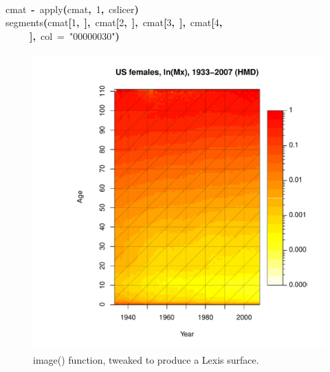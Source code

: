 \documentclass[a4paper]{article}
\newcommand{\hlnumber}[1]{\textcolor[rgb]{0.0823529411764706,0.0784313725490196,0.709803921568627}{#1}}%
\newcommand{\hlfunctioncall}[1]{\textcolor[rgb]{1,0,0}{#1}}%
\newcommand{\hlstring}[1]{\textcolor[rgb]{0.6,0.6,1}{#1}}%
\newcommand{\hlkeyword}[1]{\textcolor[rgb]{0,0,0}{\textbf{#1}}}%
\newcommand{\hlargument}[1]{\textcolor[rgb]{0.694117647058824,0.247058823529412,0.0196078431372549}{#1}}%
\newcommand{\hlassignement}[1]{\textcolor[rgb]{0.215686274509804,0.215686274509804,0.384313725490196}{\textbf{#1}}}%
\newcommand{\hlsymbol}[1]{\textcolor[rgb]{0,0,0}{#1}}%
\newcommand{\hlprompt}[1]{\textcolor[rgb]{0,0,0}{#1}}%
\newcommand{\hlstd}[1]{\textcolor[rgb]{0,0,0}{#1}}%
\newenvironment{Houtput}{\raggedright}{%
%
}
\begin{document}
\begin{Houtput}
\hlstd{}\hlprompt{{\ }}\hlkeyword{\usebox{\hlnormalsizeboxclosebrace}}\mbox{}
\normalfont
\hspace*{\fill}\\
\hlstd{}\ttfamily\noindent
\hlprompt{\usebox{\hlnormalsizeboxgreaterthan}{\ }}\hlsymbol{cmat}{\ }\hlassignement{\usebox{\hlnormalsizeboxlessthan}-}{\ }\hlfunctioncall{apply}\hlkeyword{(}\hlsymbol{cmat}\hlkeyword{,}{\ }\hlnumber{1}\hlkeyword{,}{\ }\hlsymbol{cslicer}\hlkeyword{)}\mbox{}
\normalfont
\hspace*{\fill}\\
\hlstd{}\ttfamily\noindent
\hlprompt{\usebox{\hlnormalsizeboxgreaterthan}{\ }}\hlfunctioncall{segments}\hlkeyword{(}\hlsymbol{cmat}\hlkeyword{[}\hlnumber{1}\hlkeyword{,}{\ }\hlkeyword{]}\hlkeyword{,}{\ }\hlsymbol{cmat}\hlkeyword{[}\hlnumber{2}\hlkeyword{,}{\ }\hlkeyword{]}\hlkeyword{,}{\ }\hlsymbol{cmat}\hlkeyword{[}\hlnumber{3}\hlkeyword{,}{\ }\hlkeyword{]}\hlkeyword{,}{\ }\hlsymbol{cmat}\hlkeyword{[}\hlnumber{4}\hlkeyword{,}\hspace*{\fill}\\
\hlstd{}\hlprompt{{\ }}{\ }{\ }{\ }{\ }\hlkeyword{]}\hlkeyword{,}{\ }\hlargument{col}{\ }\hlargument{=}{\ }\hlstring{"\usebox{\hlnormalsizeboxhash}00000030"}\hlkeyword{)}\mbox{}
\normalfont
\hspace*{\fill}\\
\hlstd{}
\end{Houtput}



\begin{figure}[H]
\centering
\includegraphics[width=4.5in,height=4.5in]{figs/LexisImage.pdf}
\caption{image() function, tweaked to produce a Lexis surface.}
\end{figure}
\end{document}
